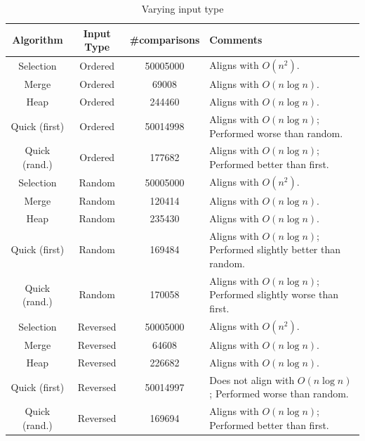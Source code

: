 \documentclass[12pt, a4paper]{article}
\begin{document}
\begin{enumerate}[start=7]
\begin{enumerate}
        \begin{table}[h!]
          \centering
          \tiny
          \begin{tabular}{|c|c|c|l|}
              \hline
              Algorithm & Input Type & \#comparisons & Comments \\
              \hline\hline
              Selection & Ordered & 50005000 & Aligns with $O(n^2)$. \\
              \hline
              Merge & Ordered & 69008 & Aligns with $O(n\log n)$. \\
              \hline
              Heap & Ordered & 244460 & Aligns with $O(n\log n)$. \\
              \hline
              Quick (first) & Ordered & 50014998 & Aligns with $O(n\log n)$; Performed worse than random. \\
              \hline
              Quick (rand.) & Ordered & 177682 & Aligns with $O(n\log n)$; Performed better than first. \\
              \hline\hline
              Selection & Random & 50005000 & Aligns with $O(n^2)$. \\
              \hline
              Merge & Random & 120414 & Aligns with $O(n\log n)$. \\
              \hline
              Heap & Random & 235430 & Aligns with $O(n\log n)$. \\
              \hline
              Quick (first) & Random & 169484 & Aligns with $O(n\log n)$; Performed slightly better than random. \\
              \hline
              Quick (rand.) & Random & 170058 & Aligns with $O(n\log n)$; Performed slightly worse than first. \\
              \hline\hline
              Selection & Reversed & 50005000 & Aligns with $O(n^2)$. \\
              \hline
              Merge & Reversed & 64608 & Aligns with $O(n\log n)$. \\
              \hline
              Heap & Reversed & 226682 & Aligns with $O(n\log n)$. \\
              \hline
              Quick (first) & Reversed & 50014997 & Does not align with $O(n\log n)$; Performed worse than random. \\
              \hline
              Quick (rand.) & Reversed & 169694 & Aligns with $O(n\log n)$; Performed better than first. \\
              \hline
          \end{tabular}
          \caption{Varying input type}
          \label{table:1}
        \end{table}


\end{enumerate}
\end{enumerate}
\end{document}

